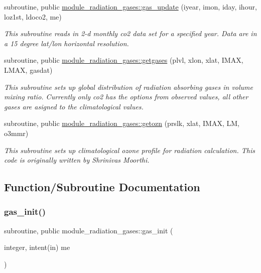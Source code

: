 \begin{DoxyCompactItemize}
subroutine, public \hyperlink{group__module__radiation__gases_gafce04ada352f998d640606528a8cd25c}{module\+\_\+radiation\+\_\+gases\+::gas\+\_\+update} (iyear, imon, iday, ihour, loz1st, ldoco2, me)
\begin{DoxyCompactList}\small\item\em This subroutine reads in 2-\/d monthly co2 data set for a specified year. Data are in a 15 degree lat/lon horizontal resolution. \end{DoxyCompactList}\item 
subroutine, public \hyperlink{group__module__radiation__gases_gacce60e9b372951eea9c6b3f28568e99c}{module\+\_\+radiation\+\_\+gases\+::getgases} (plvl, xlon, xlat, I\+M\+AX, L\+M\+AX, gasdat)
\begin{DoxyCompactList}\small\item\em This subroutine sets up global distribution of radiation absorbing gases in volume mixing ratio. Currently only co2 has the options from observed values, all other gases are asigned to the climatological values. \end{DoxyCompactList}\item 
subroutine, public \hyperlink{group__module__radiation__gases_ga91f9dd83a3832ad2615efb06b52eee92}{module\+\_\+radiation\+\_\+gases\+::getozn} (prslk, xlat, I\+M\+AX, LM, o3mmr)
\begin{DoxyCompactList}\small\item\em This subroutine sets up climatological ozone profile for radiation calculation. This code is originally written by Shrinivas Moorthi. \end{DoxyCompactList}\end{DoxyCompactItemize}


\subsection{Function/\+Subroutine Documentation}
\mbox{\label{group__module__radiation__gases_gaeff1c60060c81d3f0693a542976ee3db}} 
\subsubsection{\texorpdfstring{gas\+\_\+init()}{gas\_init()}}
{\footnotesize\ttfamily subroutine, public module\+\_\+radiation\+\_\+gases\+::gas\+\_\+init (\begin{DoxyParamCaption}\item[{integer, intent(in)}]{me }\end{DoxyParamCaption})}


